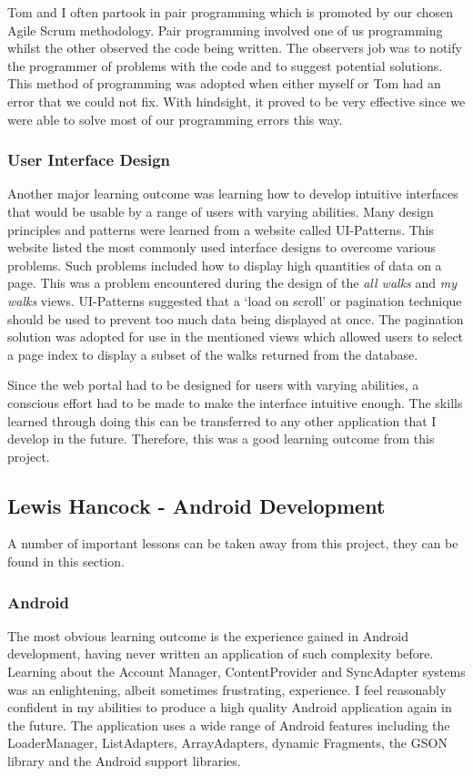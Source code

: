 \documentclass[11pt,a4paper]{report}
\begin{document}
Tom and I often partook in pair programming which is promoted by our chosen Agile Scrum methodology. Pair programming involved one of us programming whilst the other observed the code being written. The observers job was to notify the programmer of problems with the code and to suggest potential solutions. This method of programming was adopted when either myself or Tom had an error that we could not fix. With hindsight, it proved to be very effective since we were able to solve most of our programming errors this way.

\subsubsection{User Interface Design}
Another major learning outcome was learning how to develop intuitive interfaces that would be usable by a range of users with varying abilities. Many design principles and patterns were learned from a website called UI-Patterns\cite{uipatterns}. This website listed the most commonly used interface designs to overcome various problems. Such problems included how to display high quantities of data on a page. This was a problem encountered during the design of the \emph{all walks} and \emph{my walks} views. UI-Patterns suggested that a `load on scroll' or pagination technique should be used to prevent too much data being displayed at once. The pagination solution was adopted for use in the mentioned views which allowed users to select a page index to display a subset of the walks returned from the database.

Since the web portal had to be designed for users with varying abilities, a conscious effort had to be made to make the interface intuitive enough. The skills learned through doing this can be transferred to any other application that I develop in the future. Therefore, this was a good learning outcome from this project.

\subsection{Lewis Hancock - Android Development}
A number of important lessons can be taken away from this project, they can be found in this section.

\subsubsection{Android}
The most obvious learning outcome is the experience gained in Android development, having never written an application of such complexity before. Learning about the Account Manager, ContentProvider and SyncAdapter systems was an enlightening, albeit sometimes frustrating, experience. I feel reasonably confident in my abilities to produce a high quality Android application again in the future. The application uses a wide range of Android features including the LoaderManager, ListAdapters, ArrayAdapters, dynamic Fragments, the GSON library and the Android support libraries.
\end{document}
